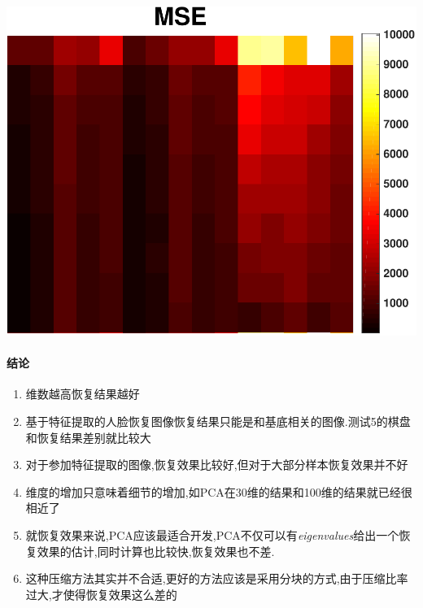 \begin{center}
\begin{minipage}[t]{\linewidth}
\center
{
		\captionsetup{justification=centering}
\includegraphics[width=\textwidth]{Img/pni_rec_mse} 
\label{fig:ica_base}
}
\end{minipage}
\medskip
\end{center}

\paragraph{结论}
\begin{enumerate}
	\item 维数越高恢复结果越好
	\item 基于特征提取的人脸恢复图像恢复结果只能是和基底相关的图像.测试5的棋盘和恢复结果差别就比较大
	\item 对于参加特征提取的图像,恢复效果比较好,但对于大部分样本恢复效果并不好
	\item 维度的增加只意味着细节的增加,如PCA在30维的结果和100维的结果就已经很相近了
	\item 就恢复效果来说,PCA应该最适合开发,PCA不仅可以有\textit{eigenvalues}给出一个恢复效果的估计,同时计算也比较快,恢复效果也不差.
	\item 这种压缩方法其实并不合适,更好的方法应该是采用分块的方式,由于压缩比率过大,才使得恢复效果这么差的
\end{enumerate}

